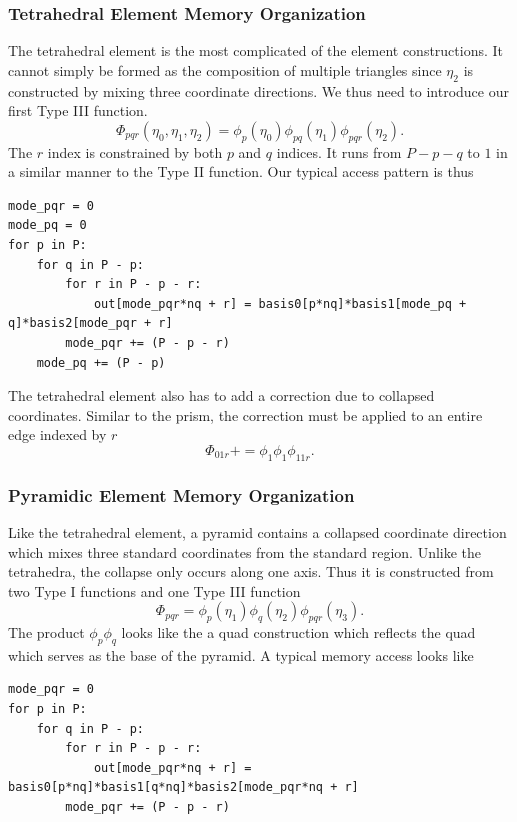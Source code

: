\subsubsection{Tetrahedral Element Memory Organization}
The tetrahedral element is the most complicated of the element constructions. It cannot simply be formed as the composition of multiple triangles since $\eta_2$ is constructed by mixing three coordinate directions. We thus need to introduce our first Type III function.
\[
    \Phi_{pqr}(\eta_0, \eta_1, \eta_2) = \phi_{p}(\eta_0) \phi_{pq} (\eta_1) \phi_{pqr}(\eta_2).
\]
The $r$ index is constrained by both $p$ and $q$ indices. It runs from $P - p - q$ to $1$ in a similar manner to the Type II function. Our typical access pattern is thus
\begin{lstlisting}
mode_pqr = 0
mode_pq = 0
for p in P:
    for q in P - p:
        for r in P - p - r:
            out[mode_pqr*nq + r] = basis0[p*nq]*basis1[mode_pq + q]*basis2[mode_pqr + r]
        mode_pqr += (P - p - r)
    mode_pq += (P - p)
\end{lstlisting}
The tetrahedral element also has to add a correction due to collapsed coordinates. Similar to the prism, the correction must be applied to an entire edge indexed by $r$
\[
    \Phi_{01r} += \phi_1 \phi_1 \phi_{11r}.
\]

\subsubsection{Pyramidic Element Memory Organization}
Like the tetrahedral element, a pyramid contains a collapsed coordinate direction which mixes three standard coordinates from the standard region. Unlike the tetrahedra, the collapse only occurs along one axis. Thus it is constructed from two Type I functions and one Type III function
\[
    \Phi_{pqr} = \phi_p(\eta_1) \phi_q(\eta_2) \phi_{pqr}(\eta_3).
\]
The product $\phi_p \phi_q$ looks like the a quad construction which reflects the quad which serves as the base of the pyramid. A typical memory access looks like
\begin{lstlisting}
mode_pqr = 0
for p in P:
    for q in P - p:
        for r in P - p - r:
            out[mode_pqr*nq + r] = basis0[p*nq]*basis1[q*nq]*basis2[mode_pqr*nq + r]
        mode_pqr += (P - p - r)
\end{lstlisting}



